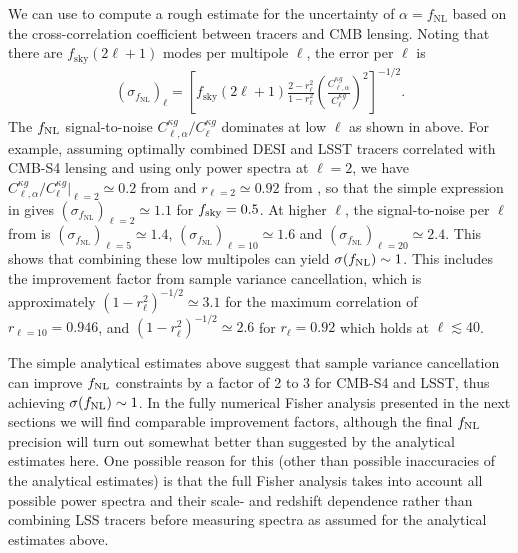 \documentclass[prd,superscriptaddress,floatfix,notitlepage,nofootinbib,reprint]{revtex4-1} %
\begin{document}
We can use  to compute a rough estimate for the uncertainty of $\alpha=f_\mathrm{NL}$ based on the cross-correlation coefficient between tracers and CMB lensing.
Noting that there are $f_\mathrm{sky}(2\ell+1)$ modes per multipole $\ell$, the error per $\ell$ is
\begin{align}
  \label{eq:SigmaFNLSimple}
  (\sigma_{f_\mathrm{NL}})_\ell = 
\left[f_\mathrm{sky}(2\ell+1)
\frac{2-r_\ell^2}{1-r_\ell^2}
\left(\frac{C^{\kappa g}_{\ell,\alpha}}{C^{\kappa g}_\ell}\right)^2 \right]^{-1/2}.
\end{align}
The ${f_\mathrm{NL}}$ signal-to-noise $C^{\kappa g}_{\ell,\alpha}/C^{\kappa g}_\ell$ dominates at low $\ell$ as shown in  above.
For example, assuming optimally combined DESI and LSST tracers correlated with CMB-S4 lensing and using only power spectra at $\ell=2$, we have $C^{\kappa g}_{\ell,\alpha}/C^{\kappa g}_{\ell}|_{\ell=2}\simeq 0.2$ from  and $r_{\ell=2}\simeq 0.92$ from , so that the simple expression in  gives $(\sigma_{f_\mathrm{NL}})_{\ell=2}\simeq 1.1$ for ${f_\mathrm{sky}}=0.5$.
At higher $\ell$, the signal-to-noise per $\ell$ from  is $(\sigma_{f_\mathrm{NL}})_{\ell=5}\simeq 1.4$, $(\sigma_{f_\mathrm{NL}})_{\ell=10}\simeq 1.6$ and $(\sigma_{f_\mathrm{NL}})_{\ell=20}\simeq 2.4$.
This shows that combining these low multipoles can yield $\sigma({f_\mathrm{NL}})\sim 1$.
This includes the improvement factor from sample variance cancellation, which is approximately $(1-r_\ell^2)^{-1/2}\simeq 3.1$ for the maximum correlation of $r_{\ell=10}=0.946$, and $(1-r_\ell^2)^{-1/2}\simeq 2.6$ for $r_\ell=0.92$ which holds at $\ell\lesssim 40$.

The simple analytical estimates above suggest that sample variance cancellation can improve ${f_\mathrm{NL}}$ constraints by a factor of 2 to 3 for CMB-S4 and LSST, thus achieving $\sigma({f_\mathrm{NL}})\sim 1$. 
In the fully numerical Fisher analysis presented in the next sections we will find comparable improvement factors, although the final ${f_\mathrm{NL}}$ precision will turn out somewhat better than suggested by the analytical estimates here. 
One possible reason for this (other than possible inaccuracies of the analytical estimates) is that the full Fisher analysis takes into account all possible power spectra and their scale- and redshift dependence rather than combining LSS tracers before measuring spectra as assumed for the analytical estimates above.
\end{document}
